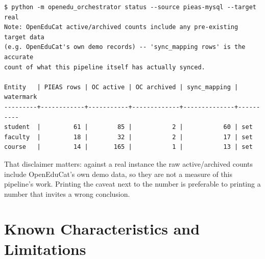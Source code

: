 \documentclass[11pt,a4paper]{article}
\begin{document}
\begin{lstlisting}[style=termstyle,caption={Real \texttt{status} output against MySQL source and
real Odoo target. The note is printed by the command itself.}]
$ python -m openedu_orchestrator status --source pieas-mysql --target real
Note: OpenEduCat active/archived counts include any pre-existing target data
(e.g. OpenEduCat's own demo records) -- 'sync_mapping rows' is the accurate
count of what this pipeline itself has actually synced.

Entity   | PIEAS rows | OC active | OC archived | sync_mapping | watermark
---------+------------+-----------+-------------+--------------+----------
student  |         61 |        85 |           2 |           60 | set
faculty  |         18 |        32 |           2 |           17 | set
course   |         14 |       165 |           1 |           13 | set
\end{lstlisting}

That disclaimer matters: against a real instance the raw active/archived counts include
OpenEduCat's own demo data, so they are not a measure of this pipeline's work. Printing the
caveat next to the number is preferable to printing a number that invites a wrong conclusion.

\section{Known Characteristics and Limitations}
\end{document}
